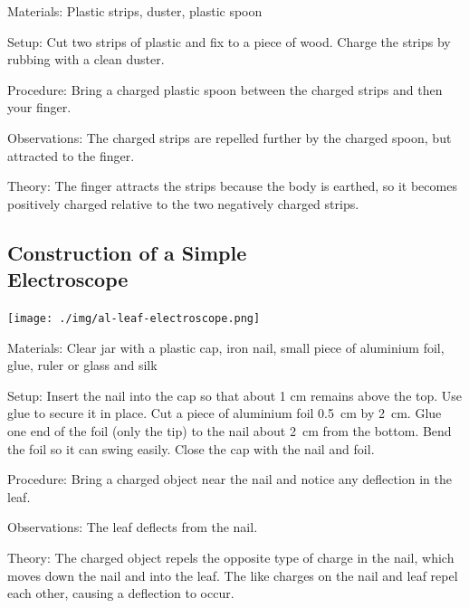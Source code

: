 \begin{multicols}{2}
\begin{description*}
\item[Materials:]{Plastic strips, duster, plastic spoon}
\item[Setup:]{Cut two strips of plastic and fix to a piece of wood. Charge the strips by rubbing with a clean duster.}
\item[Procedure:]{Bring a charged plastic spoon between the charged strips and then your finger.}
\item[Observations:]{The charged strips are repelled further by the charged spoon, but attracted to the finger.}
\item[Theory:]{The finger attracts the strips because the body is earthed, so it becomes positively
charged relative to the two negatively charged strips.}
\end{description*}

\columnbreak

\subsection[Construction of a Simple Electroscope]{Construction of a Simple \hfill \\ Electroscope}

\begin{center}
\texttt{[image: ./img/al-leaf-electroscope.png]}
\end{center}

\begin{description*}
\item[Materials:]{Clear jar with a plastic cap, iron nail, small piece of aluminium foil, glue, ruler or glass and silk}
\item[Setup:]{Insert the nail into the cap so that about 1 cm remains above the top. Use glue to secure it in place. Cut a piece of aluminium foil 0.5~cm by 2~cm. Glue one end of the foil (only the tip) to the nail about 2~cm from the bottom. Bend the foil so it can swing easily. Close the cap with the nail and foil.}
\item[Procedure:]{Bring a charged object near the nail and notice any deflection in the leaf.}
\item[Observations:]{The leaf deflects from the nail.}
\item[Theory:]{The charged object repels the opposite type of charge in the nail, which moves down the nail and into the leaf. The like charges on the nail and leaf repel each other, causing a deflection to occur.}
\end{description*}


\end{multicols}
